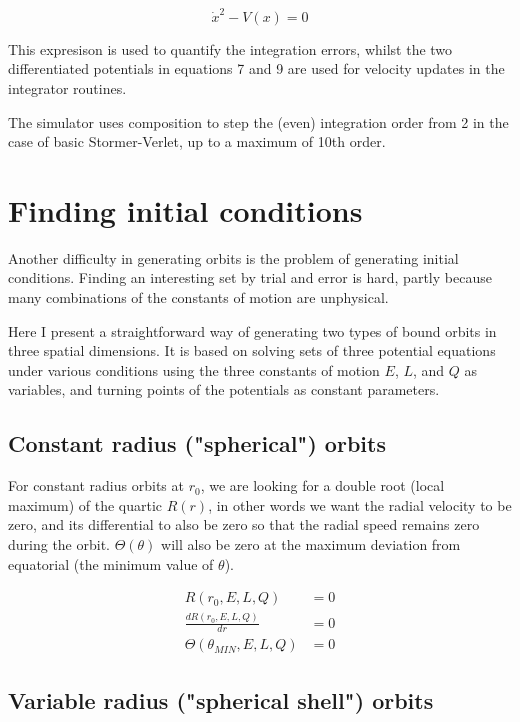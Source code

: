 \documentclass[11pt]{article}
\begin{document}
\begin{equation}
\dot x^2 - V(x) = 0
\end{equation}

This expresison is used to quantify the integration errors, whilst the two differentiated potentials in equations 7 and 9 are used for velocity updates in the integrator routines.

The simulator uses composition \cite{hairer} to step the (even) integration order from 2 in the case of basic Stormer-Verlet, up to a maximum of 10th order.

\section{Finding initial conditions}

Another difficulty in generating orbits is the problem of generating initial conditions.  Finding an interesting set by trial and error is hard, partly because many combinations of the constants of motion are unphysical.

Here I present a straightforward way of generating two types of bound orbits in three spatial dimensions.  It is based on solving sets of three potential equations under various conditions using the three constants of motion $E$, $L$, and $Q$ as variables, and turning points of the potentials as constant parameters.

\subsection{Constant radius ("spherical") orbits}

For constant radius orbits at $r_0$, we are looking for a double root (local maximum) of the quartic $R(r)$, in other words we want the radial velocity to be zero, and its differential to also be zero so that the radial speed remains zero during the orbit.  $\Theta (\theta)$ will also be zero at the maximum deviation from equatorial (the minimum value of $\theta$).

\begin{align}
R(r_0, E, L, Q) &= 0 \\
\frac{d R(r_0, E, L, Q)}{d r} &= 0 \\
\Theta(\theta_{MIN}, E, L, Q) &= 0
\end{align}

\subsection{Variable radius ("spherical shell") orbits}
\end{document}
